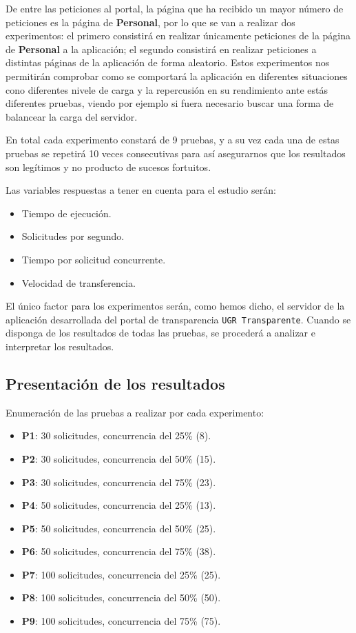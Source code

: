 \bigskip
De entre las peticiones al portal, la página que ha recibido un mayor número de peticiones es la página de \textbf{Personal}, por lo que se van a realizar dos experimentos: el primero consistirá en realizar únicamente peticiones de la página de \textbf{Personal} a la aplicación; el segundo consistirá en realizar peticiones a distintas páginas de la aplicación de forma aleatorio. Estos experimentos nos permitirán comprobar como se comportará la aplicación en diferentes situaciones cono diferentes nivele de carga y la repercusión en su rendimiento ante estás diferentes pruebas, viendo por ejemplo si fuera necesario buscar una forma de balancear la carga del servidor. 

\bigskip
En total cada experimento constará de 9 pruebas, y a su vez cada una de estas pruebas se repetirá 10 veces consecutivas para así asegurarnos que los resultados son legítimos y no producto de sucesos fortuitos.

\bigskip
Las variables respuestas a tener en cuenta para el estudio serán:

\begin{itemize}
	\item Tiempo de ejecución.
	\item Solicitudes por segundo.
	\item Tiempo por solicitud concurrente.
	\item Velocidad de transferencia.
\end{itemize}

\bigskip
El único factor para los experimentos serán, como hemos dicho, el servidor de la aplicación desarrollada del portal de transparencia {\tt UGR Transparente}. Cuando se disponga de los resultados de todas las pruebas, se procederá a analizar e interpretar los resultados.

\subsection{Presentación de los resultados}

Enumeración de las pruebas a realizar por cada experimento:

\begin{itemize}
	\item \textbf{P1}: 30 solicitudes, concurrencia del 25\% (8).
	\item \textbf{P2}: 30 solicitudes, concurrencia del 50\% (15).
	\item \textbf{P3}: 30 solicitudes, concurrencia del 75\% (23).
	\item \textbf{P4}: 50 solicitudes, concurrencia del 25\% (13).
	\item \textbf{P5}: 50 solicitudes, concurrencia del 50\% (25).
	\item \textbf{P6}: 50 solicitudes, concurrencia del 75\% (38).
	\item \textbf{P7}: 100 solicitudes, concurrencia del 25\% (25).
	\item \textbf{P8}: 100 solicitudes, concurrencia del 50\% (50).
	\item \textbf{P9}: 100 solicitudes, concurrencia del 75\% (75).
\end{itemize}

